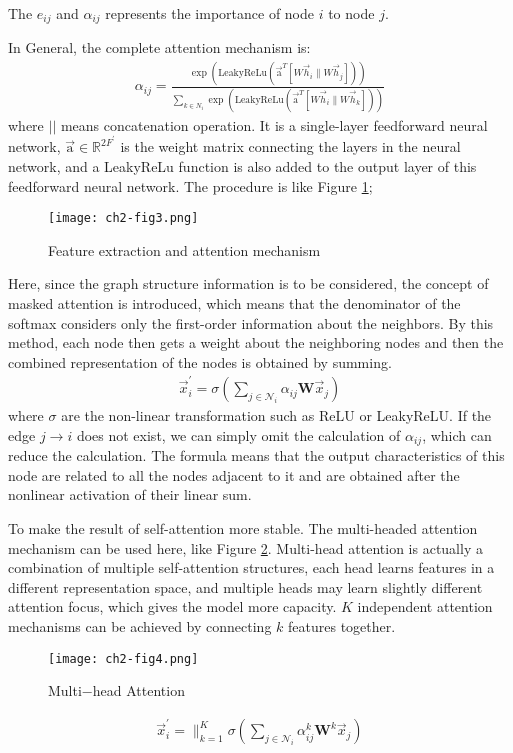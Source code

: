 The $e_{ij}$ and $\alpha_{ij}$ represents the importance of node $i$ to node $j$.

In General, the complete attention mechanism is:
\begin{align}
	\alpha_{i j}=\frac{\exp \left(\text{LeakyReLu}\left(\overrightarrow{\mathrm{a}}^{T}\left[W \vec{h}_{i} \| W \vec{h}_{j}\right]\right)\right)}{\sum_{k \in N_{i}} \exp \left(\text{LeakyReLu}\left(\overrightarrow{\mathrm{a}}^{T}\left[W \vec{h}_{i} \| W \vec{h}_{k}\right]\right)\right)}
\end{align}
where $||$ means concatenation operation. It is a single-layer feedforward neural network, $\overrightarrow { \mathrm { a } } \in \mathbb { R } ^ { 2 F ^ { \prime } }$ is the weight matrix connecting the layers in the neural network, and a LeakyReLu function is also added to the output layer of this feedforward neural network. The procedure is like Figure \ref{fig3};

\begin{figure}[h]
	\centering
	\texttt{[image: ch2-fig3.png]}
	\caption{Feature extraction and attention mechanism}
	\label{fig3}
\end{figure}

Here, since the graph structure information is to be considered, the concept of masked attention is introduced, which means that the denominator of the softmax considers only the first-order information about the neighbors. By this method, each node then gets a weight about the neighboring nodes and then the combined representation of the nodes is obtained by summing.
\begin{align}
	\vec{x}_{i}^{\prime}=\sigma\left(\sum_{j \in \mathcal{N}_{i}} \alpha_{i j} \mathbf{W} \vec{x}_{j}\right)
\end{align}
where $\sigma$ are the non-linear transformation such as ReLU or LeakyReLU. If the edge $j \to i$ does not exist, we can simply omit the calculation of $\alpha_{ij}$, which can reduce the calculation. The formula means that the output characteristics of this node are related to all the nodes adjacent to it and are obtained after the nonlinear activation of their linear sum.

To make the result of self-attention more stable. The multi-headed attention mechanism can be used here, like Figure \ref{fig4}. Multi-head attention is actually a combination of multiple self-attention structures, each head learns features in a different representation space, and multiple heads may learn slightly different attention focus, which gives the model more capacity.
$K$ independent attention mechanisms can be achieved by connecting $k$ features together.
\begin{figure}[h]
	\centering
	\texttt{[image: ch2-fig4.png]}
	\caption{Multi−head Attention}
	\label{fig4}
\end{figure}
\begin{align}
	\vec{x}_{i}^{\prime}=\|_{k=1}^{K} \sigma\left(\sum_{j \in \mathcal{N}_{i}} \alpha_{i j}^{k} \mathbf{W}^{k} \vec{x}_{j}\right)
\end{align}


